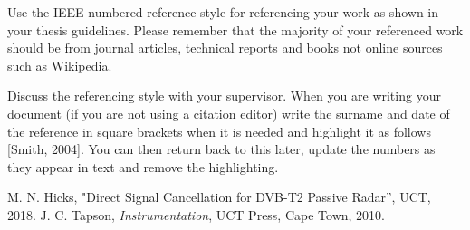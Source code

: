 Use the IEEE numbered reference style for referencing your work as shown in your thesis guidelines.
Please remember that the majority of your referenced work should be from journal articles, technical
reports and books not online sources such as Wikipedia.

Discuss the referencing style with your supervisor. When you are writing your document (if you are not using a citation editor) write the surname and date of the reference in square brackets when it is needed and highlight it as follows [Smith, 2004]. You can then return back to this later, update the numbers as they appear in text and remove the highlighting.

\begin{thebibliography}{5}
 M. N. Hicks, "Direct Signal Cancellation for DVB-T2 Passive Radar'', UCT, 2018.
 J. C. Tapson, \emph{Instrumentation}, UCT Press, Cape Town, 2010.
\end{thebibliography}
